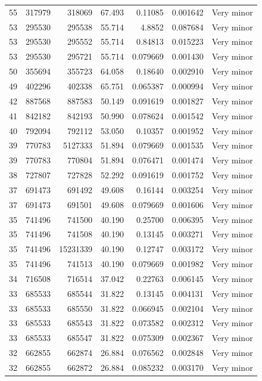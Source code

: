 \documentclass[twocolumn]{openjournal}
\begin{document}
\begin{table}[ht]
\begin{tabular}{rrrrrrr}
55 & 317979 & 318069 & 67.493 & 0.11085 & 0.001642 & Very minor \\
53 & 295530 & 295538 & 55.714 & 4.8852 & 0.087684 & Very minor \\
53 & 295530 & 295552 & 55.714 & 0.84813 & 0.015223 & Very minor \\
53 & 295530 & 295721 & 55.714 & 0.079669 & 0.001430 & Very minor \\
50 & 355694 & 355723 & 64.058 & 0.18640 & 0.002910 & Very minor \\
49 & 402296 & 402338 & 65.751 & 0.065387 & 0.000994 & Very minor \\
42 & 887568 & 887583 & 50.149 & 0.091619 & 0.001827 & Very minor \\
41 & 842182 & 842193 & 50.990 & 0.078624 & 0.001542 & Very minor \\
40 & 792094 & 792112 & 53.050 & 0.10357 & 0.001952 & Very minor \\
39 & 770783 & 5127333 & 51.894 & 0.079669 & 0.001535 & Very minor \\
39 & 770783 & 770804 & 51.894 & 0.076471 & 0.001474 & Very minor \\
38 & 727807 & 727828 & 52.292 & 0.091619 & 0.001752 & Very minor \\
37 & 691473 & 691492 & 49.608 & 0.16144 & 0.003254 & Very minor \\
37 & 691473 & 691501 & 49.608 & 0.079669 & 0.001606 & Very minor \\
35 & 741496 & 741500 & 40.190 & 0.25700 & 0.006395 & Very minor \\
35 & 741496 & 741508 & 40.190 & 0.13145 & 0.003271 & Very minor \\
35 & 741496 & 15231339 & 40.190 & 0.12747 & 0.003172 & Very minor \\
35 & 741496 & 741513 & 40.190 & 0.079669 & 0.001982 & Very minor \\
34 & 716508 & 716514 & 37.042 & 0.22763 & 0.006145 & Very minor \\
33 & 685533 & 685544 & 31.822 & 0.13145 & 0.004131 & Very minor \\
33 & 685533 & 685550 & 31.822 & 0.066945 & 0.002104 & Very minor \\
33 & 685533 & 685543 & 31.822 & 0.073582 & 0.002312 & Very minor \\
33 & 685533 & 685547 & 31.822 & 0.075309 & 0.002367 & Very minor \\
32 & 662855 & 662874 & 26.884 & 0.076562 & 0.002848 & Very minor \\
32 & 662855 & 662872 & 26.884 & 0.085232 & 0.003170 & Very minor \\

\end{tabular}
\end{table}
\end{document}
